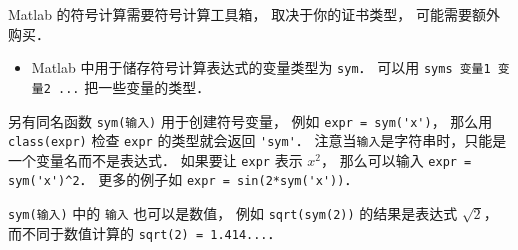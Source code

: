 
Matlab 的符号计算需要符号计算工具箱， 取决于你的证书类型， 可能需要额外购买． 

\begin{itemize}
\item Matlab 中用于储存符号计算表达式的变量类型为 \verb|sym|． 可以用 \verb|syms 变量1 变量2 ...| 把一些变量的类型．
\end{itemize}

  另有同名函数 \verb|sym(输入)| 用于创建符号变量， 例如 \verb|expr = sym('x')|， 那么用 \verb|class(expr)| 检查 \verb|expr| 的类型就会返回 \verb|'sym'|． 注意当\verb|输入|是字符串时，只能是一个变量名而不是表达式． 如果要让 \verb|expr| 表示 $x^2$， 那么可以输入 \verb|expr = sym('x')^2|． 更多的例子如 \verb|expr = sin(2*sym('x'))|．

\verb|sym(输入)| 中的 \verb|输入| 也可以是数值， 例如 \verb|sqrt(sym(2))| 的结果是表达式 $\sqrt 2$， 而不同于数值计算的 \verb|sqrt(2) = 1.414...|．


